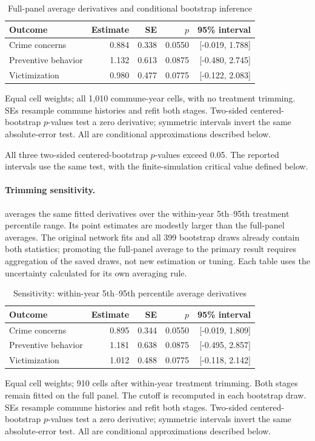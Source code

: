 \documentclass{article}
\begin{document}
\begin{table}[H]
\centering
\caption{Full-panel average derivatives and conditional bootstrap inference}
\label{tab:neural-effects}
\small
\begin{tabularx}{\linewidth}{@{}Xrrrr@{}}
\toprule
Outcome & Estimate & SE & $p$ & 95\% interval\\
\midrule
Crime concerns & 0.884 & 0.338 & 0.0550 & [-0.019, 1.788]\\
Preventive behavior & 1.132 & 0.613 & 0.0875 & [-0.480, 2.745]\\
Victimization & 0.980 & 0.477 & 0.0775 & [-0.122, 2.083]\\
\bottomrule
\end{tabularx}
\smallskip
\parbox{\linewidth}{\footnotesize Equal cell weights; all 1,010 commune-year cells, with no treatment trimming. SEs resample commune histories and refit both stages. Two-sided centered-bootstrap $p$-values test a zero derivative; symmetric intervals invert the same absolute-error test. All are conditional approximations described below.}
\end{table}

All three two-sided centered-bootstrap $p$-values exceed 0.05. The reported intervals use the same test, with the finite-simulation critical value defined below.

\paragraph{Trimming sensitivity.}
 averages the same fitted derivatives over the within-year 5th--95th treatment percentile range. Its point estimates are modestly larger than the full-panel averages. The original network fits and all 399 bootstrap draws already contain both statistics; promoting the full-panel average to the primary result requires aggregation of the saved draws, not new estimation or tuning. Each table uses the uncertainty calculated for its own averaging rule.

\begin{table}[H]
\centering
\caption{Sensitivity: within-year 5th--95th percentile average derivatives}
\label{tab:neural-trimmed}
\small
\begin{tabularx}{\linewidth}{@{}Xrrrr@{}}
\toprule
Outcome & Estimate & SE & $p$ & 95\% interval\\
\midrule
Crime concerns & 0.895 & 0.344 & 0.0550 & [-0.019, 1.809]\\
Preventive behavior & 1.181 & 0.638 & 0.0875 & [-0.495, 2.857]\\
Victimization & 1.012 & 0.488 & 0.0775 & [-0.118, 2.142]\\
\bottomrule
\end{tabularx}
\smallskip
\parbox{\linewidth}{\footnotesize Equal cell weights; 910 cells after within-year treatment trimming. Both stages remain fitted on the full panel. The cutoff is recomputed in each bootstrap draw. SEs resample commune histories and refit both stages. Two-sided centered-bootstrap $p$-values test a zero derivative; symmetric intervals invert the same absolute-error test. All are conditional approximations described below.}
\end{table}
\end{document}
